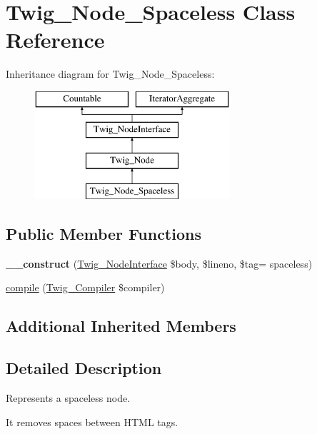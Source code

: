 \hypertarget{classTwig__Node__Spaceless}{}\section{Twig\+\_\+\+Node\+\_\+\+Spaceless Class Reference}
\label{classTwig__Node__Spaceless}
Inheritance diagram for Twig\+\_\+\+Node\+\_\+\+Spaceless\+:\begin{figure}[H]
\begin{center}
\leavevmode
\includegraphics[height=4.000000cm]{classTwig__Node__Spaceless}
\end{center}
\end{figure}
\subsection*{Public Member Functions}
\begin{DoxyCompactItemize}
\item 
{\bfseries \+\_\+\+\_\+construct} (\hyperlink{interfaceTwig__NodeInterface}{Twig\+\_\+\+Node\+Interface} \$body, \$lineno, \$tag= \textquotesingle{}spaceless\textquotesingle{})\hypertarget{classTwig__Node__Spaceless_a13d7332f7a467af14e9233bc7fe235eb}{}\label{classTwig__Node__Spaceless_a13d7332f7a467af14e9233bc7fe235eb}

\item 
\hyperlink{classTwig__Node__Spaceless_aeb37ddd1ce7595baa8f43fc03c0a7e4e}{compile} (\hyperlink{classTwig__Compiler}{Twig\+\_\+\+Compiler} \$compiler)
\end{DoxyCompactItemize}
\subsection*{Additional Inherited Members}


\subsection{Detailed Description}
Represents a spaceless node.

It removes spaces between H\+T\+ML tags.

